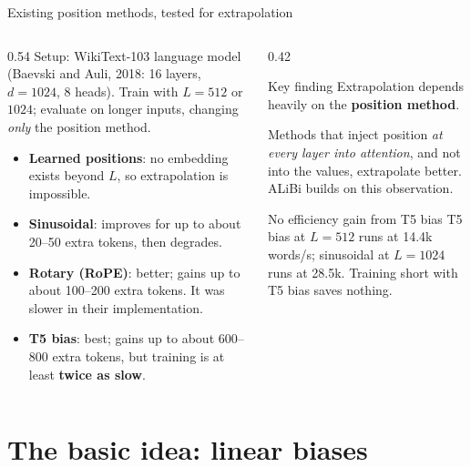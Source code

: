 \documentclass[aspectratio=169,11pt]{beamer}
\begin{document}
\begin{frame}{Existing position methods, tested for extrapolation}
  \begin{columns}[T]
    \begin{column}{0.54\textwidth}
      \small
      Setup: WikiText-103 language model (Baevski and Auli, 2018: 16 layers, $d=1024$, 8 heads). Train with $L=512$ or $1024$; evaluate on longer inputs, changing \emph{only} the position method.
      \vspace{1mm}

      \begin{itemize}
        \item \textbf{Learned positions}: no embedding exists beyond $L$, so extrapolation is impossible.
        \item \textbf{Sinusoidal}: improves for up to about 20--50 extra tokens, then degrades.
        \item \textbf{Rotary (RoPE)}: better; gains up to about 100--200 extra tokens. It was slower in their implementation.
        \item \textbf{T5 bias}: best; gains up to about 600--800 extra tokens, but training is at least \textbf{twice as slow}.
      \end{itemize}
    \end{column}
    \begin{column}{0.42\textwidth}
      \begin{exampleblock}{Key finding}
        \small
        Extrapolation depends heavily on the \textbf{position method}.
        \vspace{1mm}

        Methods that inject position \emph{at every layer into attention}, and not into the values, extrapolate better. ALiBi builds on this observation.
      \end{exampleblock}
      \begin{alertblock}{No efficiency gain from T5 bias}
        \small
        T5 bias at $L=512$ runs at 14.4k words/s; sinusoidal at $L=1024$ runs at 28.5k. Training short with T5 bias saves nothing.
      \end{alertblock}
    \end{column}
  \end{columns}
\end{frame}

\section{The basic idea: linear biases}
\end{document}
